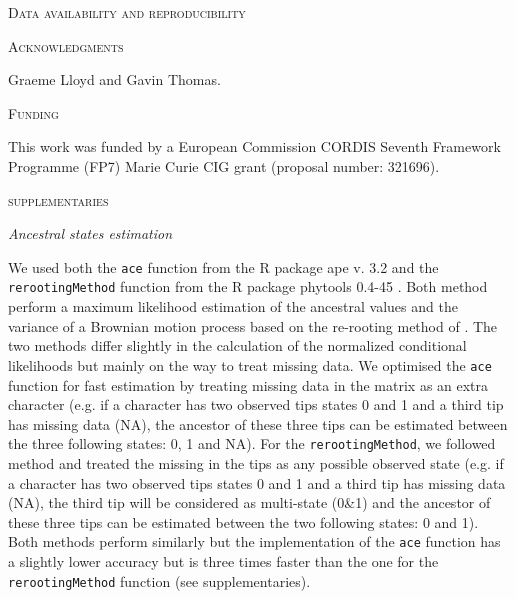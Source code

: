 \documentclass[12pt,letterpaper]{article}
\renewcommand{\section}[1]{%
\bigskip
\begin{center}
\begin{Large}
\normalfont\scshape #1
\medskip
\end{Large}
\end{center}}
\renewcommand{\subsection}[1]{%
\bigskip
\begin{center}
\begin{large}
\normalfont\itshape #1
\end{large}
\end{center}}
\begin{document}

\section{Data availability and reproducibility}

\section{Acknowledgments}
Graeme Lloyd and Gavin Thomas.

\section{Funding}
This work was funded by a European Commission CORDIS Seventh Framework Programme (FP7) Marie Curie CIG grant (proposal number: 321696).




\section{supplementaries}

\subsection{Ancestral states estimation}
We used both the \texttt{ace} function from the R package ape v. 3.2 \cite{paradisape:2004} and the 
\texttt{rerootingMethod} function from the R package phytools 0.4-45 \cite{phytools}. Both method perform a maximum likelihood estimation of the ancestral values and the variance of a Brownian motion process based on the re-rooting method of \cite{Yang01121995}. The two methods differ slightly in the calculation of the normalized conditional likelihoods but mainly on the way to treat missing data. We optimised the \texttt{ace} function for fast estimation by treating missing data in the matrix as an extra character (e.g. if a character has two observed tips states 0 and 1 and a third tip has missing data (NA), the ancestor of these three tips can be estimated between the three following states: 0, 1 and NA). For the \texttt{rerootingMethod}, we followed \cite{Claddis} method and treated the missing in the tips as any possible observed state (e.g. if a character has two observed tips states 0 and 1 and a third tip has missing data (NA), the third tip will be considered as multi-state (0\&1) and the ancestor of these three tips can be estimated between the two following states: 0 and 1). Both methods perform similarly but the implementation of the \texttt{ace} function has a slightly lower accuracy  but is three times faster than the one for the \texttt{rerootingMethod} function (see supplementaries).
\end{document}
